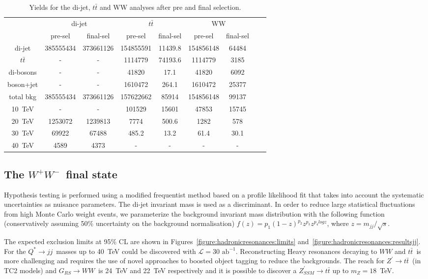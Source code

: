 \documentclass[a4paper,11pt]{article}
\newcommand*{\Zptt}{\ensuremath{Z^{\prime} \rightarrow \ttbar}}
\newcommand*{\intlumifcc}{\ensuremath{\mathcal{L}=30\text{ ab}^{-1}}}
\newcommand*{\qjj}{\ensuremath{Q^{*} \rightarrow jj}}
\newcommand*{\rsg}{\ensuremath{G_{RS} \rightarrow WW}}
\newcommand*{\ttbar}{\ensuremath{t\bar{t}}}
\newcommand*{\ww}{\ensuremath{W^{+}W^{-}}}
\begin{document}
\begin{table}[htbp]
   \centering
\begin{tabular}{|c|c|c|c|c|c|c|c|c|}
  \hline
  \hline
  & \multicolumn{2}{c|}{di-jet}  & \multicolumn{2}{c|}{$\ttbar$} & \multicolumn{2}{c|}{WW} \\
  \cline{2-7}

 & pre-sel & final-sel  & pre-sel & final-sel & pre-sel & final-sel\\
  \hline
  di-jet & 385555434 &  373661126 &  154855591 & 11439.8&  154856148 & 64484\\
  $\ttbar$ & - & - & 1114779 & 74193.6 &  1114779 & 3185\\
  di-bosons & - & - &  41820 &  17.1 &  41820 & 6092\\
  boson+jet & - & - & 1610472 & 264.1&  1610472 & 25377\\
  \hline
  total bkg  &  385555434& 373661126& 157622662 & 85914 & 154856148 & 99137\\
  \hline
  10~TeV &  - & - &  101529 & 15601 &  47853 & 15745\\
  20~TeV &   1253072 &  1239813& 7774 & 500.6 & 1282 & 578\\
  30~TeV &  69922 &  67488 & 485.2 & 13.2 &  61.4 & 30.1 \\
  40~TeV &  4589 &  4373 & - & - & - & -\\
  \hline
  \hline
\end{tabular}
  \caption{Yields for the di-jet, $\ttbar$ and WW analyses after pre and final selection.}
  \label{tab:hadronicresonances:yields}
\end{table}

\subsection{The \ww\ final state}
\label{sec:hadww}

Hypothesis testing is performed using a modified frequentist method based on a profile likelihood fit that takes into account the systematic uncertainties as nuisance parameters. The di-jet invariant mass is used as a discriminant. In order to reduce large statistical fluctuations from high Monte Carlo weight events, we parameterize the background invariant mass distribution with the following function (conservatively assuming 50\% uncertainty on the background normalisation) $f(z)=p_1(1-z)^{p_2}z^{p_3}z^{p_{4}logz}$, where $z=m_{jj}/\sqrt{s}$.

The expected exclusion limits at 95\% CL are shown in Figures~\ref{figure:hadronicresonances:limits} and~\ref{figure:hadronicresonances:resultsjj}. For the \qjj\ masses up to 40~TeV could be discovered with \intlumifcc. Reconstructing Heavy resonances decaying to $WW$ and \ttbar\ is more challenging and requires the use of novel approaches to boosted object tagging to reduce the backgrounds. The reach for \Zptt\ (in TC2 models) and \rsg\ is 24~TeV and 22~TeV respectively and it is possible to discover a $Z^{\prime}_{SSM} \rightarrow \ttbar$ up to $m_{Z}=18$~TeV.
\end{document}
